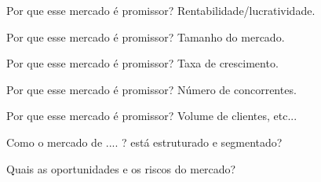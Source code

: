 \begin{commentA} \vspace{0.3cm} \noindent Por que esse mercado é promissor? Rentabilidade/lucratividade. \par \vspace{0.1cm} \end{commentA}


\begin{commentA} \vspace{0.3cm} \noindent Por que esse mercado é promissor? Tamanho do mercado. \par \vspace{0.1cm} \end{commentA}


\begin{commentA} \vspace{0.3cm} \noindent Por que esse mercado é promissor? Taxa de crescimento. \par \vspace{0.1cm} \end{commentA}


\begin{commentA} \vspace{0.3cm} \noindent Por que esse mercado é promissor? Número de concorrentes. \par \vspace{0.1cm} \end{commentA}


\begin{commentA} \vspace{0.3cm} \noindent Por que esse mercado é promissor? Volume de clientes, etc... \par \vspace{0.1cm} \end{commentA}


\begin{commentA} \vspace{0.3cm} \noindent Como o mercado de .... ? está estruturado e segmentado? \par \vspace{0.1cm} \end{commentA}


\begin{commentA} \vspace{0.3cm} \noindent Quais as oportunidades e os riscos do mercado? \par \vspace{0.1cm} \end{commentA}


\begin{commentA} \vspace{0.3cm} \noindent * \par \vspace{0.1cm} \end{commentA}

